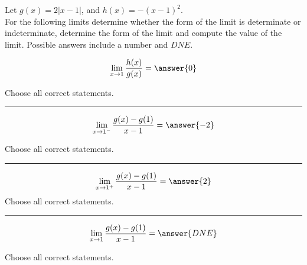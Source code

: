 \documentclass{ximera}
\author{Nela Lakos \and Kyle Parsons}
\begin{document}
\begin{exercise}

Let $g(x) = 2\left|x-1\right|$, and $h(x) = -(x-1)^2$.\\

For the following limits determine whether the form of the limit is determinate or indeterminate, determine the form of the limit and compute the value of the limit.  Possible answers include a number and $DNE$.

\[
\lim_{x\to1}\frac{h(x)}{g(x)} = \answer{0}
\]


Choose all  correct statements.
\begin{selectAll} 
\end{selectAll}

\noindent\rule[0.5ex]{\linewidth}{0.2pt}

\[
\lim_{x\to1^-}\frac{g(x)-g(1)}{x-1} = \answer{-2}
\]

Choose all  correct statements.
\begin{selectAll} 
\end{selectAll}

\noindent\rule[0.5ex]{\linewidth}{0.2pt}

\[
\lim_{x\to1^+}\frac{g(x)-g(1)}{x-1} = \answer{2}
\]
Choose all  correct statements.
\begin{selectAll} 
\end{selectAll}\noindent\rule[0.5ex]{\linewidth}{0.2pt}

\[
\lim_{x\to1}\frac{g(x)-g(1)}{x-1} = \answer{DNE}
\]

Choose all  correct statements.
\begin{selectAll} 
\end{selectAll}\end{exercise}
\end{document}
